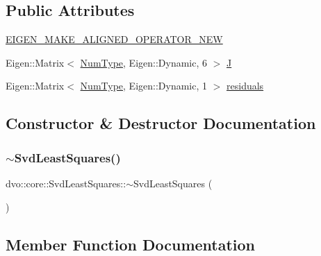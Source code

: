 \subsection*{Public Attributes}
\begin{DoxyCompactItemize}
\item 
\mbox{\hyperlink{classdvo_1_1core_1_1_svd_least_squares_a437352a5c072b985547c122d22850da6}{E\+I\+G\+E\+N\+\_\+\+M\+A\+K\+E\+\_\+\+A\+L\+I\+G\+N\+E\+D\+\_\+\+O\+P\+E\+R\+A\+T\+O\+R\+\_\+\+N\+EW}}
\item 
Eigen\+::\+Matrix$<$ \mbox{\hyperlink{namespacedvo_1_1core_ab9c199d221775a923e2549ad7e15c323}{Num\+Type}}, Eigen\+::\+Dynamic, 6 $>$ \mbox{\hyperlink{classdvo_1_1core_1_1_svd_least_squares_a8c0eaffdf1517bb11cb3fe7425e3274e}{J}}
\item 
Eigen\+::\+Matrix$<$ \mbox{\hyperlink{namespacedvo_1_1core_ab9c199d221775a923e2549ad7e15c323}{Num\+Type}}, Eigen\+::\+Dynamic, 1 $>$ \mbox{\hyperlink{classdvo_1_1core_1_1_svd_least_squares_a8f1cb060b554d4f77da3db4e7146f96b}{residuals}}
\end{DoxyCompactItemize}


\subsection{Constructor \& Destructor Documentation}
\mbox{\label{classdvo_1_1core_1_1_svd_least_squares_ae60699467df2eca3f9e8cc7814388d9f}} 
\subsubsection{\texorpdfstring{$\sim$\+Svd\+Least\+Squares()}{~SvdLeastSquares()}}
{\footnotesize\ttfamily dvo\+::core\+::\+Svd\+Least\+Squares\+::$\sim$\+Svd\+Least\+Squares (\begin{DoxyParamCaption}{ }\end{DoxyParamCaption})\hspace{0.3cm}{\ttfamily [virtual]}}



\subsection{Member Function Documentation}
\mbox{\label{classdvo_1_1core_1_1_svd_least_squares_ac91cb5c82af6eb9d91d3ef4e85dc76a3}} 
